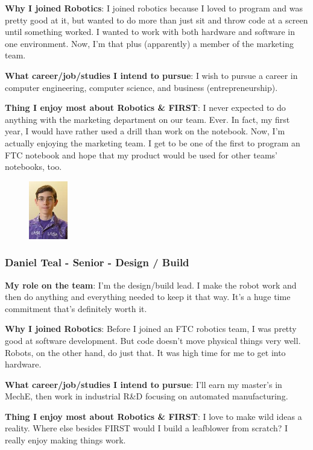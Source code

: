 {\bf Why I joined Robotics}: I joined robotics because I loved to program and was pretty good at it, but wanted to do more than just sit and throw code at a screen until something worked.  I wanted to work with both hardware and software in one environment.  Now, I'm that plus (apparently) a member of the marketing team.

{\bf What career/job/studies I intend to pursue}: I wish to pursue a career in computer engineering, computer science, and business (entrepreneurship).

{\bf Thing I enjoy most about Robotics \& FIRST}: I never expected to do anything with the marketing department on our team.  Ever.  In fact, my first year, I would have rather used a drill than work on the notebook.  Now, I'm actually enjoying the marketing team.  I get to be one of the first to program an FTC notebook and hope that my product would be used for other teams' notebooks, too.

\begin{figure}
	\centering
	\includegraphics[height=1in]{daniel}
\end{figure}
\subsubsection{Daniel Teal - Senior - Design / Build} 
{\bf My role on the team}: I'm the design/build lead. I make the robot work and then do anything and everything needed to keep it that way. It's a huge time commitment that's definitely worth it.

{\bf Why I joined Robotics}: Before I joined an FTC robotics team, I was pretty good at software development. But code doesn't move physical things very well. Robots, on the other hand, do just that. It was high time for me to get into hardware.

{\bf What career/job/studies I intend to pursue}: I'll earn my master's in MechE, then work in industrial R\&D focusing on automated manufacturing.

{\bf Thing I enjoy most about Robotics \& FIRST}: I love to make wild ideas a reality. Where else besides FIRST would I build a leafblower from scratch? I really enjoy making things work.  

